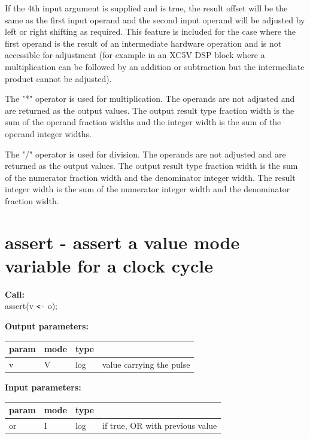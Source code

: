         If the 4th input argument is supplied and is true, the result offset
        will be the same as the first input operand and the second input operand
        will be adjusted by left or right shifting as required. This feature
        is included for the case where the first operand is the result of
        an intermediate hardware operation and is not accessible for adjustment
        (for example in an XC5V DSP block where a multiplication can be followed
        by an addition or subtraction but the intermediate product cannot be
        adjusted).
        
        The "*" operator is used for multiplication. The operands are not
        adjusted and are returned as the output values. The output result type
        fraction width is the sum of the operand fraction widths and the
        integer width is the sum of the operand integer widths.
        
        The "/" operator is used for division. The operands are not
        adjusted and are returned as the output values. The output result type
        fraction width is the sum of the numerator fraction width and the
        denominator integer width. The result integer width is the sum of the
        numerator integer width and the denominator fraction width.



    \section{assert - assert a value mode variable for a clock cycle}\label{sec:ipassert}
        
        
        {\bf Call:} \\
        assert(v \verb'<-' o);
        
        {\bf Output parameters:} \\
        \begin{tabular}{| l | l | l | l |}
        \hline
        param & mode & type & \\
        \hline \hline
        v & V & log & value carrying the pulse \\ \hline
        \end{tabular}
        
        {\bf Input parameters:} \\
        \begin{tabular}{| l | l | l | l |}
        \hline
        param & mode & type & \\
        \hline \hline
        or & I & log & if true, OR with previous value \\ \hline
        \end{tabular}
        
